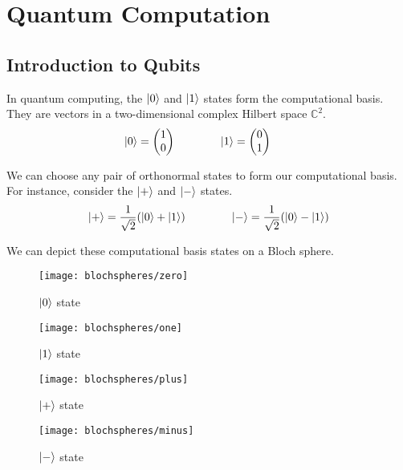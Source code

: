 \section{Quantum Computation}

\begin{comment}
    computational basis states
    bloch spheres
\end{comment}

\subsection{Introduction to Qubits}

In quantum computing, the $\ket 0$ and $\ket 1$ states form the computational basis. They are vectors in a two-dimensional complex Hilbert space $\mathbb{C}^2$.
\begin{equation*}
    \ket 0 = \begin{pmatrix} 1 \\ 0 \end{pmatrix} \qquad\qquad
    \ket 1 = \begin{pmatrix} 0 \\ 1 \end{pmatrix} \qquad
\end{equation*}

We can choose any pair of orthonormal states to form our computational basis. For instance, consider the $\ket +$ and $\ket -$ states.
\begin{equation*}
\begin{gathered}
    \ket + = \frac{1}{\sqrt{2}} (\ket 0 + \ket 1) \qquad\qquad
    \ket - = \frac{1}{\sqrt{2}} (\ket 0 - \ket 1)
\end{gathered}
\end{equation*}

We can depict these computational basis states on a Bloch sphere.
\begin{figure}[H]
\centering
    \begin{minipage}{.4\textwidth}
      \centering
      \texttt{[image: blochspheres/zero]}
      \caption{$\ket 0$ state}
    \end{minipage}%
    \begin{minipage}{.4\textwidth}
      \centering
      \texttt{[image: blochspheres/one]}
      \caption{$\ket 1$ state}
    \end{minipage}
    \begin{minipage}{.4\textwidth}
      \centering
      \texttt{[image: blochspheres/plus]}
      \caption{$\ket +$ state}
    \end{minipage}%
    \begin{minipage}{.4\textwidth}
      \centering
      \texttt{[image: blochspheres/minus]}
      \caption{$\ket -$ state}
    \end{minipage}
\end{figure}

